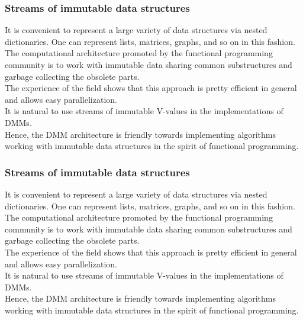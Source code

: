 \documentclass{beamer}
\newcommand{\msgray}[1]{{\color{mygray} #1}}
\begin{document}
\begin{frame}

  \frametitle{Streams of immutable data structures}

It is convenient to represent a large variety of data structures via nested dictionaries. One can represent lists, matrices, graphs, and so on in this fashion.\\[1ex]

The computational architecture promoted by the functional programming community is to work with immutable data sharing common substructures and garbage collecting the obsolete parts.\\[1ex]

The experience of the field shows that this approach is pretty efficient in general and allows easy parallelization.\\[1ex]

It is natural to use streams of immutable V-values in the implementations of DMMs.\\[1ex]

\msgray{Hence, the DMM architecture is friendly towards implementing algorithms working with immutable data structures in
the spirit of functional programming.}

\end{frame}

\begin{frame}

  \frametitle{Streams of immutable data structures}

It is convenient to represent a large variety of data structures via nested dictionaries. One can represent lists, matrices, graphs, and so on in this fashion.\\[1ex]

The computational architecture promoted by the functional programming community is to work with immutable data sharing common substructures and garbage collecting the obsolete parts.\\[1ex]

The experience of the field shows that this approach is pretty efficient in general and allows easy parallelization.\\[1ex]

It is natural to use streams of immutable V-values in the implementations of DMMs.\\[1ex]

Hence, the DMM architecture is friendly towards implementing algorithms working with immutable data structures in
the spirit of functional programming.

\end{frame}
\end{document}
